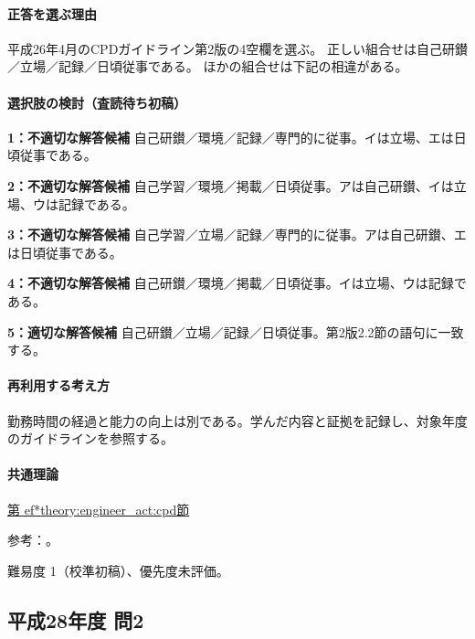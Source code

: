 \paragraph{正答を選ぶ理由} 平成26年4月のCPDガイドライン第2版の4空欄を選ぶ。 正しい組合せは自己研鑚／立場／記録／日頃従事である。 ほかの組合せは下記の相違がある。

\paragraph{選択肢の検討（査読待ち初稿）}

\noindent\textbf{1：不適切な解答候補} 自己研鑚／環境／記録／専門的に従事。イは立場、エは日頃従事である。\par

\noindent\textbf{2：不適切な解答候補} 自己学習／環境／掲載／日頃従事。アは自己研鑚、イは立場、ウは記録である。\par

\noindent\textbf{3：不適切な解答候補} 自己学習／立場／記録／専門的に従事。アは自己研鑚、エは日頃従事である。\par

\noindent\textbf{4：不適切な解答候補} 自己研鑚／環境／掲載／日頃従事。イは立場、ウは記録である。\par

\noindent\textbf{5：適切な解答候補} 自己研鑚／立場／記録／日頃従事。第2版2.2節の語句に一致する。\par

\paragraph{再利用する考え方} 勤務時間の経過と能力の向上は別である。学んだ内容と証拠を記録し、対象年度のガイドラインを参照する。

\paragraph{共通理論} \hyperref[theory:engineer_act:cpd]{第
ef*{theory:engineer_act:cpd}節}

\par 参考：\cite{cpd_v2}。

\par 難易度 1（校準初稿）、優先度未評価。

\subsection{平成28年度 問2}
\label{q:h28-reg-apt-02}

